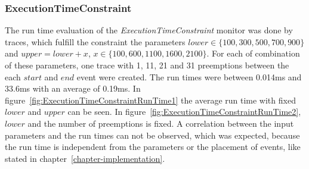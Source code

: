 \subsubsection{ExecutionTimeConstraint}
	The run time evaluation of the \textit{ExecutionTimeConstraint} monitor was done by traces, which fulfill the constraint the parameters $lower\in\{100,300,500,700,900\}$ and $upper=lower+x$, $x\in\{100,600,1100,1600,2100\}$. For each of combination of these parameters, one trace with 1, 11, 21 and 31 preemptions between the each $start$ and $end$ event were created. The run times were between 0.014ms and 33.6ms with an average of 0.19ms. In figure~\ref{fig:ExecutionTimeConstraintRunTime1} the average run time with fixed $lower$ and $upper$ can be seen. In figure~\ref{fig:ExecutionTimeConstraintRunTime2}, $lower$ and the number of preemptions is fixed. A correlation between the input parameters and the run times can not be observed, which was expected, because the run time is independent from the parameters or the placement of events, like stated in chapter~\ref{chapter-implementation}.
